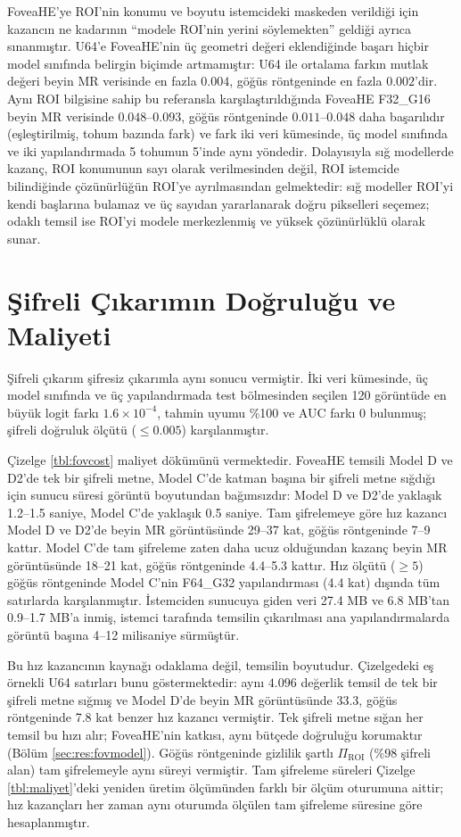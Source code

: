 FoveaHE'ye ROI'nin konumu ve boyutu istemcideki maskeden verildiği için kazancın ne kadarının ``modele ROI'nin yerini söylemekten'' geldiği ayrıca sınanmıştır. U64'e FoveaHE'nin üç geometri değeri eklendiğinde başarı hiçbir model sınıfında belirgin biçimde artmamıştır: U64 ile ortalama farkın mutlak değeri beyin MR verisinde en fazla $0.004$, göğüs röntgeninde en fazla $0.002$'dir. Aynı ROI bilgisine sahip bu referansla karşılaştırıldığında FoveaHE F32\_G16 beyin MR verisinde $0.048$--$0.093$, göğüs röntgeninde $0.011$--$0.048$ daha başarılıdır (eşleştirilmiş, tohum bazında fark) ve fark iki veri kümesinde, üç model sınıfında ve iki yapılandırmada 5 tohumun 5'inde aynı yöndedir. Dolayısıyla sığ modellerde kazanç, ROI konumunun sayı olarak verilmesinden değil, ROI istemcide bilindiğinde çözünürlüğün ROI'ye ayrılmasından gelmektedir: sığ modeller ROI'yi kendi başlarına bulamaz ve üç sayıdan yararlanarak doğru pikselleri seçemez; odaklı temsil ise ROI'yi modele merkezlenmiş ve yüksek çözünürlüklü olarak sunar.

\section{Şifreli Çıkarımın Doğruluğu ve Maliyeti}\label{sec:res:fovcost}

Şifreli çıkarım şifresiz çıkarımla aynı sonucu vermiştir. İki veri kümesinde, üç model sınıfında ve üç yapılandırmada test bölmesinden seçilen 120 görüntüde en büyük logit farkı $1.6 \times 10^{-4}$, tahmin uyumu \%100 ve AUC farkı $0$ bulunmuş; şifreli doğruluk ölçütü ($\leq 0.005$) karşılanmıştır.

Çizelge \ref{tbl:fovcost} maliyet dökümünü vermektedir. FoveaHE temsili Model D ve D2'de tek bir şifreli metne, Model C'de katman başına bir şifreli metne sığdığı için sunucu süresi görüntü boyutundan bağımsızdır: Model D ve D2'de yaklaşık 1.2--1.5 saniye, Model C'de yaklaşık 0.5 saniye. Tam şifrelemeye göre hız kazancı Model D ve D2'de beyin MR görüntüsünde 29--37 kat, göğüs röntgeninde 7--9 kattır. Model C'de tam şifreleme zaten daha ucuz olduğundan kazanç beyin MR görüntüsünde 18--21 kat, göğüs röntgeninde 4.4--5.3 kattır. Hız ölçütü ($\geq 5$) göğüs röntgeninde Model C'nin F64\_G32 yapılandırması (4.4 kat) dışında tüm satırlarda karşılanmıştır. İstemciden sunucuya giden veri 27.4 MB ve 6.8 MB'tan 0.9--1.7 MB'a inmiş, istemci tarafında temsilin çıkarılması ana yapılandırmalarda görüntü başına 4--12 milisaniye sürmüştür.

Bu hız kazancının kaynağı odaklama değil, temsilin boyutudur. Çizelgedeki eş örnekli U64 satırları bunu göstermektedir: aynı $4.096$ değerlik temsil de tek bir şifreli metne sığmış ve Model D'de beyin MR görüntüsünde 33.3, göğüs röntgeninde 7.8 kat benzer hız kazancı vermiştir. Tek şifreli metne sığan her temsil bu hızı alır; FoveaHE'nin katkısı, aynı bütçede doğruluğu korumaktır (Bölüm \ref{sec:res:fovmodel}). Göğüs röntgeninde gizlilik şartlı $\Pi_{\mathrm{ROI}}$ (\%98 şifreli alan) tam şifrelemeyle aynı süreyi vermiştir. Tam şifreleme süreleri Çizelge \ref{tbl:maliyet}'deki yeniden üretim ölçümünden farklı bir ölçüm oturumuna aittir; hız kazançları her zaman aynı oturumda ölçülen tam şifreleme süresine göre hesaplanmıştır.

